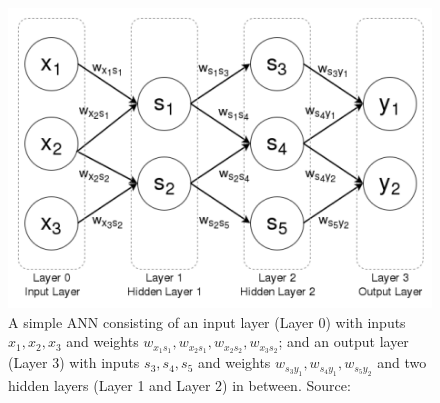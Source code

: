 \documentclass[master]{thesis-uestc}
\begin{document}
\begin{figure}[ht]
\includegraphics[width=5in]{pic/ANN.png}
\caption{A simple ANN consisting of an input layer (Layer 0) with inputs $x_1, x_2, x_3$ and weights $w_{x_1s_1}, w_{x_2s_1}, w_{x_2s_2}, w_{x_3s_2}$; and an output layer (Layer 3) with inputs $s_3, s_4, s_5$ and weights $w_{s_3y_1}, w_{s_4y_1}, w_{s_5y_2}$ and two hidden layers (Layer 1 and Layer 2) in between. Source:\cite{McGonagle}}
\label{fig_ANN}
\end{figure}
\end{document}
